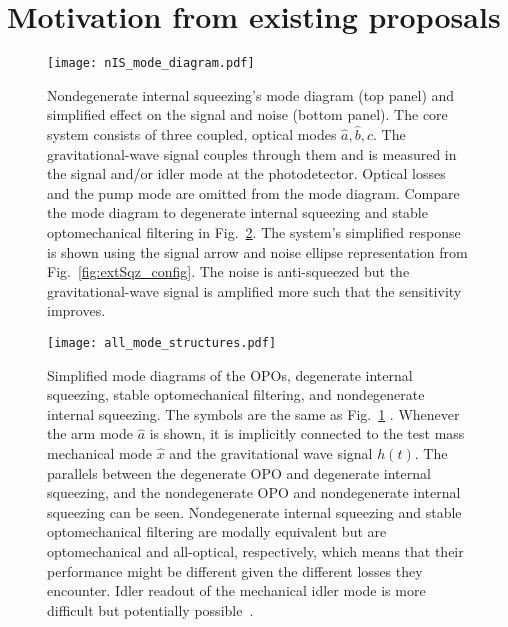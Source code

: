 \section{Motivation from existing proposals}
\label{sec:modal_equivalence}

\begin{figure}
    \centering
    \texttt{[image: nIS\_mode\_diagram.pdf]}
    \caption{  Nondegenerate internal squeezing's mode diagram (top panel) and simplified effect on the signal and noise (bottom panel). The core system consists of three coupled, optical modes $\hat a,\hat b,\hat c$. The gravitational-wave signal couples through them and is measured in the signal and/or idler mode at the photodetector. Optical losses and the pump mode are omitted from the mode diagram. Compare the mode diagram to degenerate internal squeezing and stable optomechanical filtering in Fig.~\ref{fig:mode_diagram}. The system's simplified response is shown using the signal arrow and noise ellipse representation from Fig.~\ref{fig:extSqz_config}. The noise is anti-squeezed but the gravitational-wave signal is amplified more such that the sensitivity improves.}
    \label{fig:nIS_mode_diagram}
\end{figure}
\begin{figure}
    \centering
    \texttt{[image: all\_mode\_structures.pdf]}
    \caption{Simplified mode diagrams of the OPOs, degenerate internal squeezing, stable optomechanical filtering, and nondegenerate internal squeezing. The symbols are the same as Fig.~\ref{fig:nIS_mode_diagram} . Whenever the arm mode $\hat a$ is shown, it is implicitly connected to the test mass mechanical mode $\hat x$ and the gravitational wave signal $h(t)$. The parallels between the degenerate OPO and degenerate internal squeezing, and the nondegenerate OPO and nondegenerate internal squeezing can be seen. Nondegenerate internal squeezing and stable optomechanical filtering are modally equivalent but are optomechanical and all-optical, respectively, which means that their performance might be different given the different losses they encounter. Idler readout of the mechanical idler mode is more difficult but potentially possible~\cite{Li2021}.}
    \label{fig:mode_diagram}
\end{figure}

